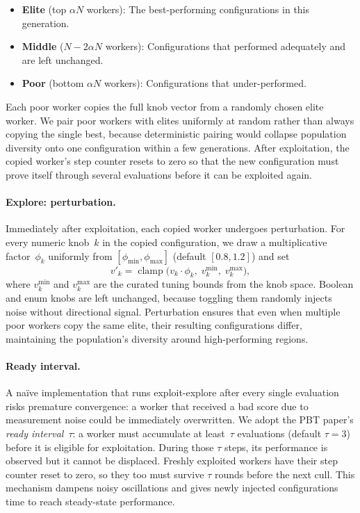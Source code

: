 \begin{itemize}
  \item \textbf{Elite} (top $\alpha N$ workers): The best-performing
    configurations in this generation.
  \item \textbf{Middle} ($N - 2\alpha N$ workers): Configurations that
    performed adequately and are left unchanged.
  \item \textbf{Poor} (bottom $\alpha N$ workers): Configurations that
    under-performed.
\end{itemize}

Each poor worker copies the full knob vector from a randomly chosen elite
worker.  We pair poor workers with elites uniformly at random rather than
always copying the single best, because deterministic pairing would collapse
population diversity onto one configuration within a few generations.  After
exploitation, the copied worker's step counter resets to zero so that the new
configuration must prove itself through several evaluations before it can be
exploited again.

\paragraph{Explore: perturbation.}
Immediately after exploitation, each copied worker undergoes perturbation.
For every numeric knob~$k$ in the copied configuration, we draw a
multiplicative factor~$\phi_k$ uniformly from $[\phi_{\min}, \phi_{\max}]$
(default $[0.8, 1.2]$) and set
\begin{equation}
  v'_k = \operatorname{clamp}\!\bigl(v_k \cdot \phi_k,\; v_k^{\min},\; v_k^{\max}\bigr),
  \label{eq:perturb}
\end{equation}
where $v_k^{\min}$ and $v_k^{\max}$ are the curated tuning bounds from the
knob space.  Boolean and enum knobs are left unchanged, because toggling them
randomly injects noise without directional signal.  Perturbation ensures that
even when multiple poor workers copy the same elite, their resulting
configurations differ, maintaining the population's diversity around
high-performing regions.

\paragraph{Ready interval.}
A na\"ive implementation that runs exploit-explore after every single
evaluation risks premature convergence: a worker that received a bad score due
to measurement noise could be immediately overwritten.  We adopt the PBT
paper's \emph{ready interval}~$\tau$: a worker must accumulate at
least~$\tau$ evaluations (default $\tau = 3$) before it is eligible for
exploitation.  During those $\tau$ steps, its performance is observed but it
cannot be displaced.  Freshly exploited workers have their step counter reset
to zero, so they too must survive $\tau$ rounds before the next cull.  This
mechanism dampens noisy oscillations and gives newly injected configurations
time to reach steady-state performance.

